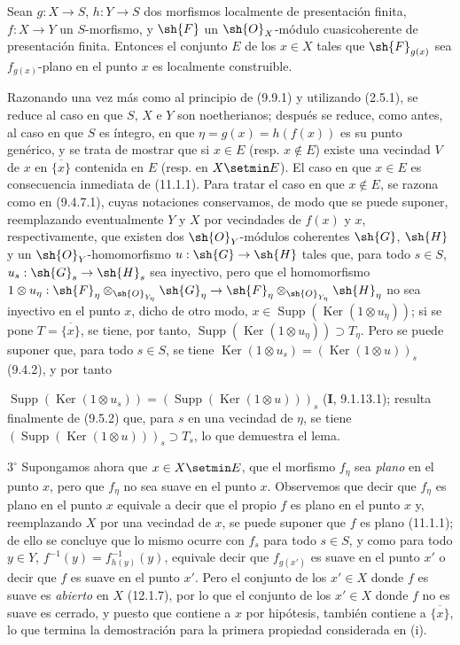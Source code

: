 \begin{lemma}[17.7.11.1]
\label{IV.17.7.11.1}
Sean $g:X\to S$, $h:Y\to S$ dos morfismos localmente de presentación finita, $f:X\to Y$ un $S$-morfismo, y $\sh{F}$ un $\sh{O}_X$-módulo cuasicoherente de presentación finita. Entonces el conjunto $E$ de los $x\in X$ tales que $\sh{F}_{g(x)}$ sea $f_{g(x)}$-plano en el punto $x$ es localmente construible.
\end{lemma}

Razonando una vez más como al principio de (9.9.1) y utilizando (2.5.1), se reduce al caso en que $S$, $X$ e $Y$ son noetherianos; después se reduce, como antes, al caso en que $S$ es íntegro, en que $\eta=g(x)=h(f(x))$ es su punto genérico, y se trata de mostrar que si $x\in E$ (resp. $x\notin E$) existe una vecindad $V$ de $x$ en $\overline{\{x\}}$ contenida en $E$ (resp. en $X\setmin E$). El caso en que $x\in E$ es consecuencia inmediata de (11.1.1). Para tratar el caso en que $x\notin E$, se razona como en (9.4.7.1), cuyas notaciones conservamos, de modo que se puede suponer, reemplazando eventualmente $Y$ y $X$ por vecindades de $f(x)$ y $x$, respectivamente, que existen dos $\sh{O}_Y$-módulos coherentes $\sh{G}$, $\sh{H}$ y un $\sh{O}_Y$-homomorfismo $u:\sh{G}\to\sh{H}$ tales que, para todo $s\in S$, $u_s:\sh{G}_s\to\sh{H}_s$ sea inyectivo, pero que el homomorfismo $1\otimes u_\eta:\sh{F}_\eta\otimes_{\sh{O}_{Y_\eta}}\sh{G}_\eta\to\sh{F}_\eta\otimes_{\sh{O}_{Y_\eta}}\sh{H}_\eta$ no sea inyectivo en el punto $x$, dicho de otro modo, $x\in\operatorname{Supp}(\operatorname{Ker}(1\otimes u_\eta))$; si se pone $T=\overline{\{x\}}$, se tiene, por tanto, $\operatorname{Supp}(\operatorname{Ker}(1\otimes u_\eta))\supset T_\eta$. Pero se puede suponer que, para todo $s\in S$, se tiene $\operatorname{Ker}(1\otimes u_s)=(\operatorname{Ker}(1\otimes u))_s$ (9.4.2), y por tanto


$\operatorname{Supp}(\operatorname{Ker}(1\otimes u_s))=(\operatorname{Supp}(\operatorname{Ker}(1\otimes u)))_s$ (\textbf I, 9.1.13.1); resulta finalmente de (9.5.2) que, para $s$ en una vecindad de $\eta$, se tiene $(\operatorname{Supp}(\operatorname{Ker}(1\otimes u)))_s\supset T_s$, lo que demuestra el lema.

$3^\circ$ Supongamos ahora que $x\in X\setmin E$, que el morfismo $f_\eta$ sea \emph{plano} en el punto $x$, pero que $f_\eta$ no sea suave en el punto $x$. Observemos que decir que $f_\eta$ es plano en el punto $x$ equivale a decir que el propio $f$ es plano en el punto $x$ y, reemplazando $X$ por una vecindad de $x$, se puede suponer que $f$ es plano (11.1.1); de ello se concluye que lo mismo ocurre con $f_s$ para todo $s\in S$, y como para todo $y\in Y$, $f^{-1}(y)=f_{h(y)}^{-1}(y)$, equivale decir que $f_{g(x')}$ es suave en el punto $x'$ o decir que $f$ es suave en el punto $x'$. Pero el conjunto de los $x'\in X$ donde $f$ es suave es \emph{abierto} en $X$ (12.1.7), por lo que el conjunto de los $x'\in X$ donde $f$ no es suave es cerrado, y puesto que contiene a $x$ por hipótesis, también contiene a $\overline{\{x\}}$, lo que termina la demostración para la primera propiedad considerada en (i).

